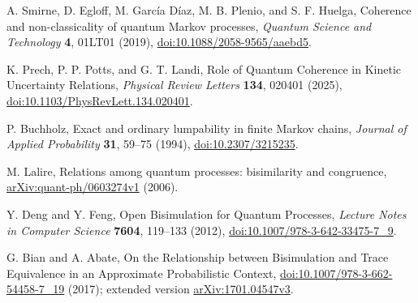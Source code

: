 A. Smirne, D. Egloff, M. Garc\'ia D\'iaz, M. B. Plenio, and S. F. Huelga,
Coherence and non-classicality of quantum Markov processes,
\emph{Quantum Science and Technology} \textbf{4}, 01LT01 (2019),
\href{https://doi.org/10.1088/2058-9565/aaebd5}{doi:10.1088/2058-9565/aaebd5}.

K. Prech, P. P. Potts, and G. T. Landi,
Role of Quantum Coherence in Kinetic Uncertainty Relations,
\emph{Physical Review Letters} \textbf{134}, 020401 (2025),
\href{https://doi.org/10.1103/PhysRevLett.134.020401}{doi:10.1103/PhysRevLett.134.020401}.

P. Buchholz,
Exact and ordinary lumpability in finite Markov chains,
\emph{Journal of Applied Probability} \textbf{31}, 59--75 (1994),
\href{https://doi.org/10.2307/3215235}{doi:10.2307/3215235}.

M. Lalire,
Relations among quantum processes: bisimilarity and congruence,
\href{https://arxiv.org/abs/quant-ph/0603274v1}{arXiv:quant-ph/0603274v1} (2006).

Y. Deng and Y. Feng,
Open Bisimulation for Quantum Processes,
\emph{Lecture Notes in Computer Science} \textbf{7604}, 119--133 (2012),
\href{https://doi.org/10.1007/978-3-642-33475-7_9}{doi:10.1007/978-3-642-33475-7\_9}.

G. Bian and A. Abate,
On the Relationship between Bisimulation and Trace Equivalence in an
Approximate Probabilistic Context,
\href{https://doi.org/10.1007/978-3-662-54458-7_19}{doi:10.1007/978-3-662-54458-7\_19}
(2017); extended version
\href{https://arxiv.org/abs/1701.04547v3}{arXiv:1701.04547v3}.
